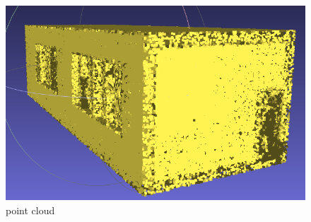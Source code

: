 \documentclass{article}
\begin{document}
\vspace{0.5cm}
\begin{figure}[H]
  \centering
  \begin{minipage}[t]{0.32\textwidth}
    \includegraphics[width=\textwidth]{../../images/screen_kinetic/3zones_point_cloud.png}
    \caption*{point cloud}
  \end{minipage}


\end{figure}
\end{document}
